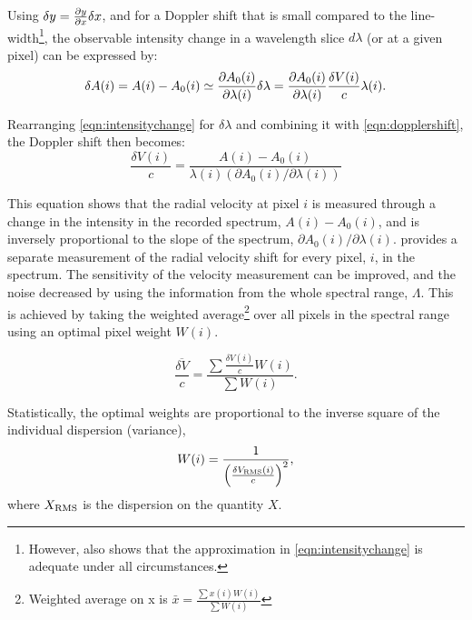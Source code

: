 
Using \(\delta y = \frac{\partial{y}}{\partial{x}} \delta x \nonumber\), and for a Doppler shift that is small compared to the line-width\footnote{However,\citet{connes_absolute_1985} also shows that the approximation in \cref{eqn:intensitychange} is adequate under all circumstances.}, the observable intensity change in a wavelength slice \(d \lambda\) (or at a given pixel) can be expressed by:
\begin{equation}
\delta A(i) = A(i) - {A}_{0}(i) \simeq \frac{\partial{{A}_{0}(i)}}{\partial{\lambda(i)}} \delta \lambda = \frac{\partial{{A}_{0}(i)}}{\partial{\lambda(i)}} \frac{\delta V(i)}{c}\lambda(i).
\label{eqn:intensitychange}
\end{equation}

Rearranging \cref{eqn:intensitychange} for \(\delta \lambda\) and combining it with \cref{eqn:dopplershift}, the Doppler shift then becomes:
\begin{equation}
\frac{\delta V(i)}{c} = \frac{A(i) - {A}_{0}(i) }{\lambda(i) (\partial {A}_{0}(i)/\partial \lambda(i))} \label{eqn:delta_v_i}
\end{equation}

This equation shows that the radial velocity at pixel {\(i\)} is measured through a change in the intensity in the recorded spectrum, \(A(i)-{A}_{0}(i)\), and is inversely proportional to the slope of the spectrum, \({\partial {A}_{0}(i)}/{\partial \lambda(i)}\).
 provides a separate measurement of the radial velocity shift for every pixel, \(i\), in the spectrum.
The sensitivity of the velocity measurement can be improved, and the noise decreased by using the information from the whole spectral range, \(\Lambda\).
This is achieved by taking the weighted average\footnote{Weighted average on x is \(\bar{x} = \frac{\sum{ x(i)W(i)}}{\sum {W(i)}}\)} over all pixels in the spectral range using an optimal pixel weight \(W(i)\).

\begin{equation}
\overline{\frac{\delta V}{c}} = \frac{\sum{\frac{\delta V(i)}{c}W(i)}}{\sum {W(i)}}.
\end{equation}

Statistically, the optimal weights are proportional to the inverse square of the individual dispersion (variance),
\begin{equation}
W(i) = \frac{1}{{\left(\frac{\delta V_{\textrm{RMS}}(i)}{c}\right)}^{2}}, \label{eqn:weights}
\end{equation}
where \(X_{\textrm{RMS}}\) is the dispersion on the quantity \(X\).

